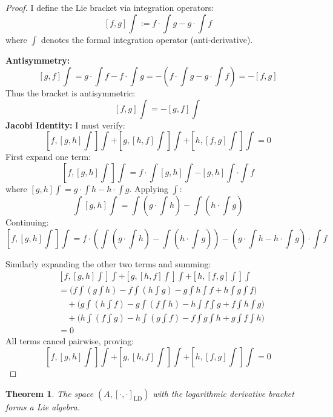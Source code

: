 \documentclass{artjlt}
\newtheorem{thm}{Theorem}
\newcommand{\?}{\textbackslash}
\begin{document}
\begin{proof}
I define the Lie bracket via integration operators:
\[
[f,g]\int := f \cdot \int g - g \cdot \int f 
\]
where $\int $ denotes the formal integration operator (anti-derivative).

\noindent\textbf{Antisymmetry:}
\[
[g,f]\int = g \cdot \int f - f \cdot \int g = - (f \cdot \int g - g \cdot \int f) = -[f,g]
\]
Thus the bracket is antisymmetric:
\[
\boxed{[f,g]\int = -[g,f]\int} 
\]
\noindent\textbf{Jacobi Identity:}
I must verify:
\[
[f,[g,h]\int]\int + [g,[h,f]\int]\int + [h,[f,g]\int]\int = 0
\]
First expand one term:
\[
[f,[g,h] \int]\int = f \cdot \int [g,h] \int - [g,h] \int \cdot \int f
\]
where $[g,h]\int = g \cdot \int h - h \cdot \int g$. Applying $\int $:
\[
\int [g,h] \int= \int (g \cdot \int h) - \int (h \cdot \int g)
\]
Continuing:
\[
[f,[g,h]\int]\int = f \cdot (\int (g \cdot \int h) - \int (h \cdot \int g)) - (g \cdot \int h - h \cdot \int g) \cdot \int f
\]

Similarly expanding the other two terms and summing:
\[
\begin{aligned}
&[f,[g,h]\int]\int + [g,[h,f]\int]\int + [h,[f,g]\int]\int \\
&= \big(f \int (g \int h) - f \int (h \int g) - g \int h \int f + h \int g \int f\big) \\
&\quad + \big(g \int (h \int f) - g \int (f \int h) - h \int f \int g + f \int h \int g\big) \\
&\quad + \big(h \int (f \int g) - h \int (g \int f) - f \int g \int h + g \int f \int h\big) \\
&= 0
\end{aligned}
\]
All terms cancel pairwise, proving:
\[
\boxed{[f,[g,h]\int]\int + [g,[h,f]\int]\int + [h,[f,g]\int]\int = 0} 
\]


\end{proof}
   
   \begin{thm}
The space $(A, [\cdot,\cdot]_{\text{LD}})$ with the logarithmic derivative bracket forms a Lie algebra.
\end{thm}
\end{document}
